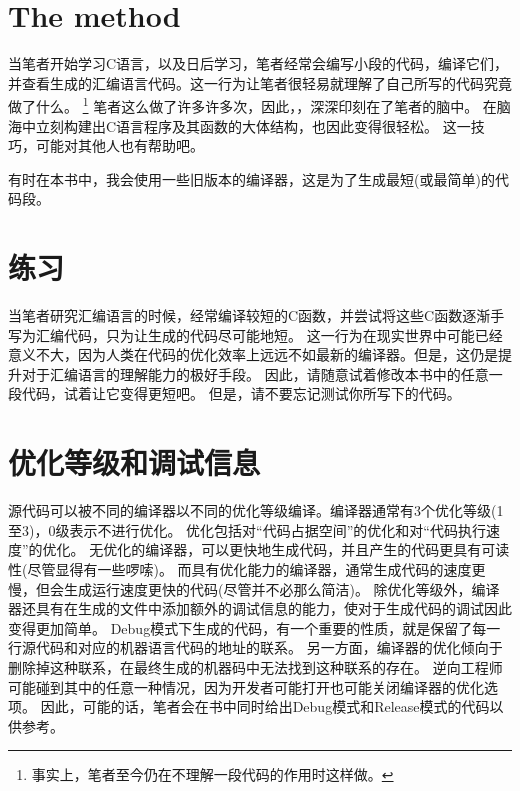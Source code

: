 \section{The method}

当笔者开始学习C语言，以及日后学习，笔者经常会编写小段的代码，编译它们，并查看生成的汇编语言代码。这一行为让笔者很轻易就理解了自己所写的代码究竟做了什么。
\footnote{事实上，笔者至今仍在不理解一段代码的作用时这样做。}
笔者这么做了许多许多次，因此，，深深印刻在了笔者的脑中。
在脑海中立刻构建出C语言程序及其函数的大体结构，也因此变得很轻松。
这一技巧，可能对其他人也有帮助吧。


有时在本书中，我会使用一些旧版本的编译器，这是为了生成最短(或最简单)的代码段。

\section*{练习}

当笔者研究汇编语言的时候，经常编译较短的C函数，并尝试将这些C函数逐渐手写为汇编代码，只为让生成的代码尽可能地短。
这一行为在现实世界中可能已经意义不大，因为人类在代码的优化效率上远远不如最新的编译器。但是，这仍是提升对于汇编语言的理解能力的极好手段。
因此，请随意试着修改本书中的任意一段代码，试着让它变得更短吧。
但是，请不要忘记测试你所写下的代码。

\section*{优化等级和调试信息}

源代码可以被不同的编译器以不同的优化等级编译。编译器通常有3个优化等级(1至3)，0级表示不进行优化。
优化包括对“代码占据空间”的优化和对“代码执行速度”的优化。
无优化的编译器，可以更快地生成代码，并且产生的代码更具有可读性(尽管显得有一些啰嗦)。
而具有优化能力的编译器，通常生成代码的速度更慢，但会生成运行速度更快的代码(尽管并不必那么简洁)。
除优化等级外，编译器还具有在生成的文件中添加额外的调试信息的能力，使对于生成代码的调试因此变得更加简单。
Debug模式下生成的代码，有一个重要的性质，就是保留了每一行源代码和对应的机器语言代码的地址的联系。
另一方面，编译器的优化倾向于删除掉这种联系，在最终生成的机器码中无法找到这种联系的存在。
逆向工程师可能碰到其中的任意一种情况，因为开发者可能打开也可能关闭编译器的优化选项。
因此，可能的话，笔者会在书中同时给出Debug模式和Release模式的代码以供参考。
